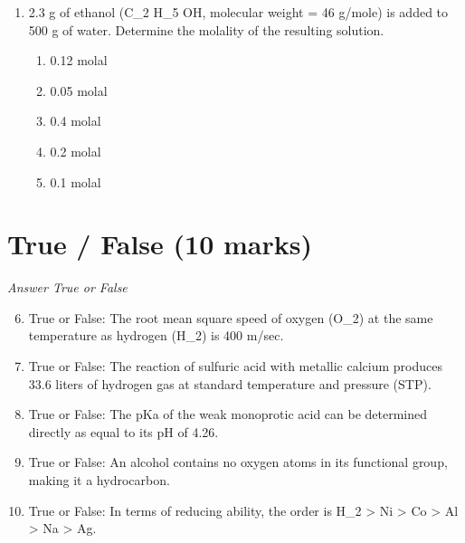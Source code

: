 \documentclass[12pt]{article}
\begin{document}
\begin{enumerate}[label=\arabic*.]
\begin{enumerate}[label=(\alph*)]
    \item 1.2$\mathrm{dm}^3 \mathrm{~mol}^{-1}$
    \item 1.35$\mathrm{dm}^3 \mathrm{~mol}^{-1}$
    \item 2.0$\mathrm{dm}^3 \mathrm{~mol}^{-1}$
    \item 0.8$\mathrm{dm}^3 \mathrm{~mol}^{-1}$
    \item 1.8$\mathrm{dm}^3 \mathrm{~mol}^{-1}$
\end{enumerate}
\item 2.3 g of ethanol (C\_2 H\_5 OH, molecular weight = 46 g/mole) is added to 500 g of water. Determine the molality of the resulting solution.
\begin{enumerate}[label=(\alph*)]
    \item 0.12 molal
    \item 0.05 molal
    \item 0.4 molal
    \item 0.2 molal
    \item 0.1 molal
\end{enumerate}
\end{enumerate}

\section*{True / False (10 marks)}
\textit{Answer True or False}
\begin{enumerate}[label=\arabic*.]
\setcounter{enumi}{5}
\item True or False: The root mean square speed of oxygen (O\_2) at the same temperature as hydrogen (H\_2) is 400 m/sec.
\item True or False: The reaction of sulfuric acid with metallic calcium produces 33.6 liters of hydrogen gas at standard temperature and pressure (STP).
\item True or False: The pKa of the weak monoprotic acid can be determined directly as equal to its pH of 4.26.
\item True or False: An alcohol contains no oxygen atoms in its functional group, making it a hydrocarbon.
\item True or False: In terms of reducing ability, the order is H\_2 \textgreater{} Ni \textgreater{} Co \textgreater{} Al \textgreater{} Na \textgreater{} Ag.
\end{enumerate}
\end{document}
